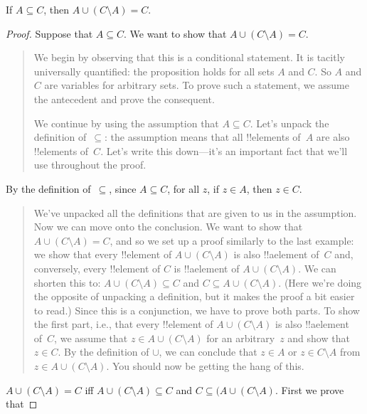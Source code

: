 \documentclass[../../../include/open-logic-section]{subfiles}
\begin{document}

\begin{prop}
If $A \subseteq C$, then $A \cup (C \setminus A) = C$.
\end{prop}  

\begin{proof}
  Suppose that $A \subseteq C$.  We want to show that $A \cup (C
  \setminus A) = C$.
  \begin{quote}
    We begin by observing that this is a conditional statement. It is
    tacitly universally quantified: the proposition holds for all sets
    $A$ and $C$. So $A$ and $C$ are variables for arbitrary sets. To
    prove such a statement, we assume the antecedent and prove the
    consequent.

    We continue by using the assumption that $A \subseteq C$. Let's
    unpack the definition of~$\subseteq$: the assumption means that
    all !!{element}s of~$A$ are also !!{element}s of~$C$. Let's write
    this down---it's an important fact that we'll use throughout the
    proof.
  \end{quote}
  By the definition of~$\subseteq$, since $A \subseteq C$, for all
  $z$, if $z \in A$, then $z \in C$.
  \begin{quote}
    We've unpacked all the definitions that are given to us in the
    assumption. Now we can move onto the conclusion. We want to show
    that $A \cup (C \setminus A) = C$, and so we set up a proof
    similarly to the last example: we show that every !!{element} of
    $A \cup (C \setminus A)$ is also !!a{element} of~$C$ and,
    conversely, every !!{element} of $C$ is !!a{element} of $A \cup (C
    \setminus A)$. We can shorten this to: $A \cup (C \setminus A)
    \subseteq C$ and $C \subseteq A \cup (C \setminus A)$. (Here we're
    doing the opposite of unpacking a definition, but it makes the
    proof a bit easier to read.)  Since this is a conjunction, we have
    to prove both parts. To show the first part, i.e., that every
    !!{element} of $A \cup (C \setminus A)$ is also !!a{element}
    of~$C$, we assume that $z \in A \cup (C \setminus A)$ for an
    arbitrary~$z$ and show that $z \in C$. By the definition of
    $\cup$, we can conclude that $z \in A$ or $z \in C \setminus A$
    from $z \in A \cup (C \setminus A)$. You should now be getting the
    hang of this.
    \end{quote}
  $A \cup (C \setminus A) = C$ iff $A \cup (C \setminus A) \subseteq
  C$ and $C \subseteq (A \cup (C \setminus A)$.  First we prove that

\end{proof}
\end{document}
